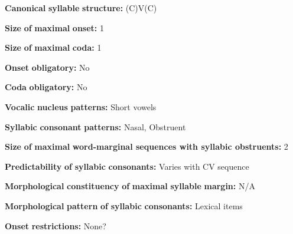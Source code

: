 \begin{styleBody}
\textbf{Canonical} \textbf{syllable} \textbf{structure:} (C)V(C) \citep[31-34]{Chang2006}
\end{styleBody}

\begin{styleBody}
\textbf{Size} \textbf{of} \textbf{maximal} \textbf{onset:} 1
\end{styleBody}

\begin{styleBody}
\textbf{Size} \textbf{of} \textbf{maximal} \textbf{coda:} 1
\end{styleBody}

\begin{styleBody}
\textbf{Onset} \textbf{obligatory:} No
\end{styleBody}

\begin{styleBody}
\textbf{Coda} \textbf{obligatory:} No
\end{styleBody}

\begin{styleBody}
\textbf{Vocalic} \textbf{nucleus} \textbf{patterns:} Short vowels
\end{styleBody}

\begin{styleBody}
\textbf{Syllabic} \textbf{consonant} \textbf{patterns:} Nasal, Obstruent
\end{styleBody}

\begin{styleBody}
\textbf{Size} \textbf{of} \textbf{maximal} \textbf{word{}-marginal sequences with syllabic obstruents:} 2
\end{styleBody}

\begin{styleBody}
\textbf{Predictability} \textbf{of} \textbf{syllabic} \textbf{consonants:} Varies with CV sequence
\end{styleBody}

\begin{styleBody}
\textbf{Morphological} \textbf{constituency} \textbf{of} \textbf{maximal} \textbf{syllable} \textbf{margin:} N/A
\end{styleBody}

\begin{styleBody}
\textbf{Morphological} \textbf{pattern} \textbf{of} \textbf{syllabic} \textbf{consonants:} Lexical items
\end{styleBody}

\begin{styleBody}
\textbf{Onset} \textbf{restrictions:} None?
\end{styleBody}

